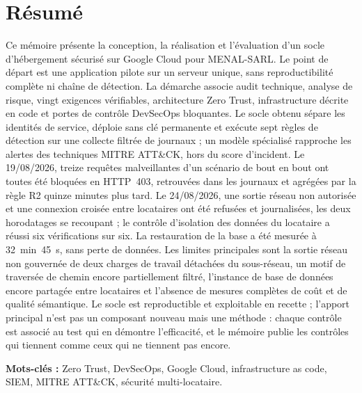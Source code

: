 \chapter*{Résumé}
\thispagestyle{plain}
\vspace*{-10pt}

{\footnotesize

Ce mémoire présente la conception, la réalisation et l'évaluation d'un socle d'hébergement
sécurisé sur Google Cloud pour MENAL-SARL. Le point de départ est une application pilote sur un
serveur unique, sans reproductibilité complète ni chaîne de détection. La démarche associe audit
technique, analyse de risque, vingt exigences vérifiables, architecture Zero Trust,
infrastructure décrite en code et portes de contrôle DevSecOps bloquantes. Le socle obtenu
sépare les identités de service, déploie sans clé permanente et exécute sept règles de détection
sur une collecte filtrée de journaux ; un modèle spécialisé rapproche les alertes des techniques
MITRE ATT\&CK, hors du score d'incident. Le 19/08/2026, treize requêtes malveillantes d'un
scénario de bout en bout ont toutes été bloquées en HTTP~403, retrouvées dans les journaux et
agrégées par la règle R2 quinze minutes plus tard. Le 24/08/2026, une sortie réseau non
autorisée et une connexion croisée entre locataires ont été refusées et journalisées, les deux
horodatages se recoupant ; le contrôle d'isolation des données du locataire a réussi six
vérifications sur six. La restauration de la base a été mesurée à 32~min~45~s, sans perte de
données. Les limites principales sont la sortie réseau non gouvernée de deux charges de travail
détachées du sous-réseau, un motif de traversée de chemin encore partiellement filtré, l'instance
de base de données encore partagée entre locataires et l'absence de mesures complètes de coût et
de qualité sémantique. Le socle est reproductible et exploitable en recette ; l'apport principal
n'est pas un composant nouveau mais une méthode : chaque contrôle est associé au test qui en
démontre l'efficacité, et le mémoire publie les contrôles qui tiennent comme ceux qui ne
tiennent pas encore.

\par\vspace{4pt}
\noindent\textbf{Mots-clés :} Zero Trust, DevSecOps, Google Cloud, infrastructure as code,
SIEM, MITRE ATT\&CK, sécurité multi-locataire.

}
